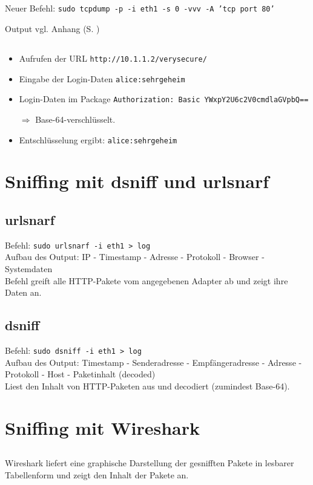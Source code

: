 \documentclass[twoside]{article}
\newcommand{\ttt}[1]{%
	\texttt{#1}%
}
\newcommand{\mref}[1]{\nameref{#1} (S. \pageref{#1})}
\begin{document}
\subsection{}
Neuer Befehl: \ttt{sudo tcpdump -p -i eth1 -s 0 -vvv -A 'tcp port 80'}
Output vgl. Anhang \mref{http-sniffing}
\subsection{}
\begin{itemize}
	\item Aufrufen der URL \ttt{http://10.1.1.2/verysecure/}
	\item Eingabe der Login-Daten \ttt{alice:sehrgeheim}
	\item Login-Daten im Package \ttt{Authorization: Basic YWxpY2U6c2V0cmdlaGVpbQ==}
	$\Rightarrow$ Base-64-verschlüsselt.
	\item Entschlüsselung ergibt: \ttt{alice:sehrgeheim}
\end{itemize}


\section{Sniffing mit dsniff und urlsnarf}
\subsection{urlsnarf}
Befehl:\ttt{sudo urlsnarf -i eth1 > log}\\
Aufbau des Output: IP - Timestamp - Adresse - Protokoll - Browser - Systemdaten\\
Befehl greift alle HTTP-Pakete vom angegebenen Adapter ab und zeigt ihre Daten an.
\subsection{dsniff}
Befehl: \ttt{sudo dsniff -i eth1 > log}\\
Aufbau des Output: Timestamp - Senderadresse - Empfängeradresse - Adresse - Protokoll - Host - Paketinhalt (decoded)\\
Liest den Inhalt von HTTP-Paketen aus und decodiert (zumindest Base-64).
\section{Sniffing mit Wireshark}
\subsection{}
Wireshark liefert eine graphische Darstellung der gesnifften Pakete in lesbarer Tabellenform und zeigt den Inhalt der Pakete an.
\end{document}
